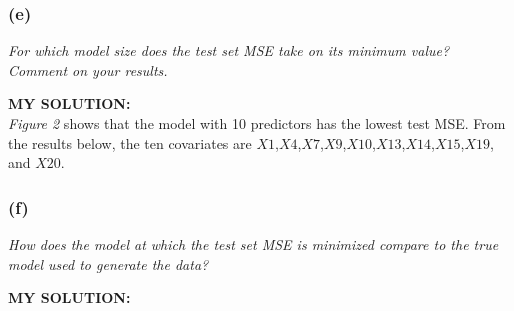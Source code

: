 \documentclass[
]{article}
\newenvironment{Shaded}{\begin{snugshade}}{\end{snugshade}}
\newcommand{\DecValTok}[1]{\textcolor[rgb]{0.00,0.00,0.81}{#1}}
\newcommand{\NormalTok}[1]{#1}
\newcommand{\SpecialCharTok}[1]{\textcolor[rgb]{0.00,0.00,0.00}{#1}}
\newcommand{\StringTok}[1]{\textcolor[rgb]{0.31,0.60,0.02}{#1}}
\begin{document}
\hypertarget{e}{%
\subsubsection{(e)}\label{e}}

\emph{For which model size does the test set MSE take on its minimum
value? Comment on your results.}

\textbf{MY SOLUTION:}\\
\emph{Figure 2} shows that the model with 10 predictors has the lowest
test MSE. From the results below, the ten covariates are
\(X1\),\(X4\),\(X7\),\(X9\),\(X10\),\(X13\),\(X14\),\(X15\),\(X19\), and
\(X20\).

\begin{Shaded}
\end{Shaded}

\hypertarget{f}{%
\subsubsection{(f)}\label{f}}

\emph{How does the model at which the test set MSE is minimized compare
to the true model used to generate the data? }

\textbf{MY SOLUTION:}
\end{document}
